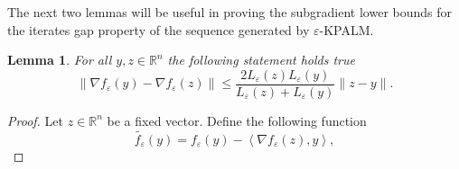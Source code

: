 \documentclass[12pt]{article}
\numberwithin{equation}{section}
\newtheorem{lemma}{Lemma}[proposition]
\begin{document}
The next two lemmas will be useful in proving the subgradient lower bounds for the iterates gap property of the sequence generated by $\varepsilon$-KPALM.

\begin{lemma} \label{StateEq65}
For all $y,z \in \mathbb{R}^n$ the following statement holds true
\begin{equation*}
	\| \nabla f_{\varepsilon}(y) - \nabla f_{\varepsilon}(z) \| \leq \frac{2L_{\varepsilon}(z)L_{\varepsilon}(y)}{L_{\varepsilon}(z)+L_{\varepsilon}(y)} \|z - y\|.
\end{equation*}
\end{lemma}

\begin{proof}
Let $z \in \mathbb{R}^n$ be a fixed vector. Define the following function
\begin{equation*}
	\widetilde{f_{\varepsilon}}(y) = f_{\varepsilon}(y) - \left\langle \nabla f_{\varepsilon}(z), y \right\rangle ,
\end{equation*}

\end{proof}
\end{document}
